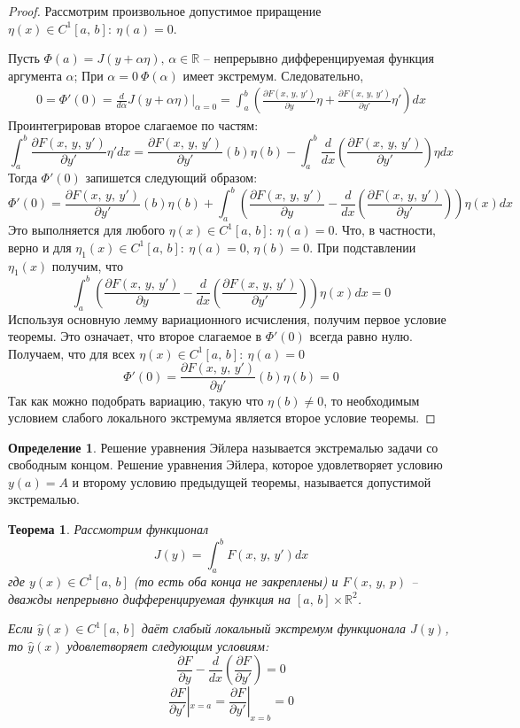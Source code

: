 \documentclass[a4paper,12pt]{article}
\theoremstyle{plain}
\newtheorem{theorem}{Теорема}[section]
\theoremstyle{definition}
\newtheorem{definition}{Определение}[section]
\theoremstyle{remark}
\begin{document}
\begin{proof}
	Рассмотрим произвольное допустимое приращение $\eta(x) \in C^1[a,\,b]:\: \eta(a) = 0$.

	Пусть $\Phi(a) = J(y + \alpha\eta),\, \alpha \in \mathbb{R}$ -- непрерывно дифференцируемая функция аргумента $\alpha$; При $\alpha = 0\: \Phi(\alpha)$ имеет экстремум. Следовательно,
	\begin{align*}
		0 = \Phi'(0) = \frac{d}{d\alpha}J(y + \alpha\eta)|_{\alpha = 0} = \int_a^b \left(\frac{\partial F(x,\,y,\,y')}{\partial y}\eta + \frac{\partial F(x,\,y,\,y')}{\partial y'}\eta'\right)dx
	\end{align*}
	Проинтегрировав второе слагаемое по частям:
	\[\int_a^b \frac{\partial F(x,\,y,\,y')}{\partial y'}\eta'dx = \frac{\partial F(x,\,y,\,y')}{\partial y'}(b)\eta(b) - \int_a^b \frac{d}{dx}\left(\frac{\partial F(x,\,y,\,y')}{\partial y'}\right)\eta dx\]
	Тогда $\Phi'(0)$ запишется следующий образом:
	\[\Phi'(0) = \frac{\partial F(x,\,y,\,y')}{\partial y'}(b)\eta(b) + \int_a^b \left(\frac{\partial F(x,\,y,\,y')}{\partial y} - \frac{d}{dx}\left(\frac{\partial F(x,\,y,\,y')}{\partial y'}\right)\right)\eta(x) dx\]
	Это выполняется для любого $\eta(x) \in C^1[a,\,b]:\: \eta(a) = 0$. Что, в частности, верно и для $\eta_1(x) \in C^1[a,\,b]:\: \eta(a) = 0,\, \eta(b) = 0$. При подставлении $\eta_1(x)$ получим, что
	\[\int_a^b \left(\frac{\partial F(x,\,y,\,y')}{\partial y} - \frac{d}{dx}\left(\frac{\partial F(x,\,y,\,y')}{\partial y'}\right)\right)\eta(x) dx = 0\]
	Используя основную лемму вариационного исчисления, получим первое условие теоремы. Это означает, что второе слагаемое в $\Phi'(0)$ всегда равно нулю. Получаем, что для всех $\eta(x) \in C^1[a,\,b]:\: \eta(a) = 0$
	\[\Phi'(0) = \frac{\partial F(x,\,y,\,y')}{\partial y'}(b)\eta(b) = 0\]
	Так как можно подобрать вариацию, такую что $\eta(b) \neq 0$, то необходимым условием слабого локального экстремума является второе условие теоремы.
\end{proof}

\begin{definition}
	Решение уравнения Эйлера называется экстремалью задачи со свободным концом. Решение уравнения Эйлера, которое удовлетворяет условию $y(a) = A$ и второму условию предыдущей теоремы, называется допустимой экстремалью.
\end{definition}

\begin{theorem}
	Рассмотрим функционал
	\[J(y) = \int_a^b F(x,\, y,\, y')dx\]
	где $y(x) \in C^1[a,\,b]$ (то есть оба конца не закреплены) и $F(x,\,y,\,p)$ -- дважды непрерывно дифференцируемая функция на $[a,\,b] \times \mathbb{R}^2$.

	Если $\hat{y}(x) \in C^1[a,\,b]$ даёт слабый локальный экстремум функционала $J(y)$, то $\hat{y}(x)$ удовлетворяет следующим условиям:
	\[\frac{\partial F}{\partial y} - \frac{d}{dx}\left(\frac{\partial F}{\partial y'}\right) = 0\]
	\[\frac{\partial F}{\partial y'}|_{x = a} = \frac{\partial F}{\partial y'}|_{x = b} = 0\]
\end{theorem}
\end{document}
